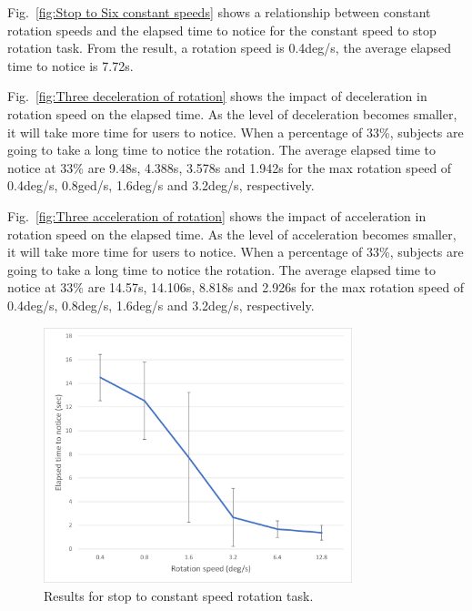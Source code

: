 Fig.~\ref{fig:Stop to Six constant speeds} shows a relationship between constant rotation speeds and the elapsed time to notice for the constant speed to stop rotation task. From the result, a rotation speed is 0.4deg/s, the average elapsed time to notice is 7.72s.

Fig.~\ref{fig:Three deceleration of rotation} shows the impact of deceleration in rotation speed on the elapsed time. As the level of deceleration becomes smaller, it will take more time for users to notice. When a percentage of 33\%, subjects are going to take a long time to notice the rotation. The average elapsed time to notice at 33\% are 9.48s, 4.388s, 3.578s and 1.942s for the max rotation speed of 0.4deg/s, 0.8ged/s, 1.6deg/s and 3.2deg/s, respectively.

Fig.~\ref{fig:Three acceleration of rotation} shows the impact of acceleration in rotation speed on the elapsed time. As the level of acceleration becomes smaller, it will take more time for users to notice. When a percentage of 33\%, subjects are going to take a long time to notice the rotation. The average elapsed time to notice at 33\% are 14.57s, 14.106s, 8.818s and 2.926s for the max rotation speed of 0.4deg/s, 0.8deg/s, 1.6deg/s and 3.2deg/s, respectively.
\newpage
\begin{figure}[H]\centering
	\includegraphics[width=0.8\textwidth]{Pictures/Six constant speeds.png}%
	\caption{Results for stop to constant speed rotation task.}\label{fig:Six constant speeds}%
	
\end{figure}
